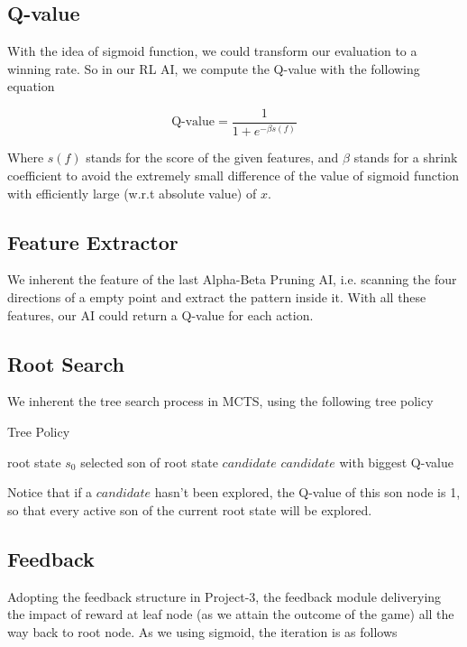 \documentclass[a4paper, 12pt]{article} %
\begin{document}
\begin{multicols}{2}
		\subsection{Q-value}
		
		With the idea of sigmoid function, we could transform our evaluation to a winning rate. So in our RL AI, we compute the Q-value with the following equation
		
		\begin{equation*}
			\text{Q-value} = \frac{1}{1 + e^{-\beta s(f)}}
		\end{equation*}
	
		Where $s(f)$ stands for the score of the given features, and $\beta$ stands for a shrink coefficient to avoid the extremely small difference of the value of sigmoid function with efficiently large (w.r.t absolute value) of $x$.
		
		\subsection{Feature Extractor}
		
		We inherent the feature of the last Alpha-Beta Pruning AI, i.e. scanning the four directions of a empty point and extract the pattern inside it. With all these features, our AI could return a Q-value for each action.
		 
		\subsection{Root Search}
		We inherent the tree search process in MCTS, using the following tree policy
		
		\begin{algorithm}[H]
			\caption{Tree Policy}
			\begin{algorithmic}[1]
				\Require root state $s_0$
				\Ensure selected son of root state $candidate$
				\Return $candidate$ with biggest Q-value
			\end{algorithmic}
		\end{algorithm}
	
		Notice that if a $candidate$ hasn't been explored, the Q-value of this son node is 1, so that every active son of the current root state will be explored.
		
		\subsection{Feedback}
		
		Adopting the feedback structure in Project-3, the feedback module deliverying the impact of reward at leaf node (as we attain the outcome of the game) all the way back to root node. As we using sigmoid, the iteration is as follows
		

\end{multicols}
\end{document}
